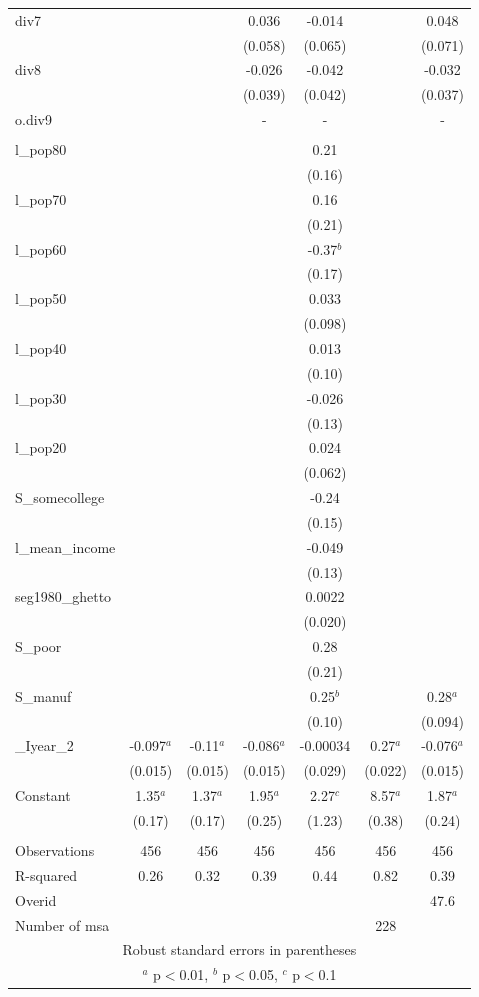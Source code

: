 \documentclass[]{article}
\begin{document}
\begin{tabular}{lcccccc}
div7 &  &  & 0.036 & -0.014 &  & 0.048 \\
 &  &  & (0.058) & (0.065) &  & (0.071) \\
div8 &  &  & -0.026 & -0.042 &  & -0.032 \\
 &  &  & (0.039) & (0.042) &  & (0.037) \\
o.div9 &  &  & - & - &  & - \\
 &  &  &  &  &  &  \\
l\_pop80 &  &  &  & 0.21 &  &  \\
 &  &  &  & (0.16) &  &  \\
l\_pop70 &  &  &  & 0.16 &  &  \\
 &  &  &  & (0.21) &  &  \\
l\_pop60 &  &  &  & -0.37$^b$ &  &  \\
 &  &  &  & (0.17) &  &  \\
l\_pop50 &  &  &  & 0.033 &  &  \\
 &  &  &  & (0.098) &  &  \\
l\_pop40 &  &  &  & 0.013 &  &  \\
 &  &  &  & (0.10) &  &  \\
l\_pop30 &  &  &  & -0.026 &  &  \\
 &  &  &  & (0.13) &  &  \\
l\_pop20 &  &  &  & 0.024 &  &  \\
 &  &  &  & (0.062) &  &  \\
S\_somecollege &  &  &  & -0.24 &  &  \\
 &  &  &  & (0.15) &  &  \\
l\_mean\_income &  &  &  & -0.049 &  &  \\
 &  &  &  & (0.13) &  &  \\
seg1980\_ghetto &  &  &  & 0.0022 &  &  \\
 &  &  &  & (0.020) &  &  \\
S\_poor &  &  &  & 0.28 &  &  \\
 &  &  &  & (0.21) &  &  \\
S\_manuf &  &  &  & 0.25$^b$ &  & 0.28$^a$ \\
 &  &  &  & (0.10) &  & (0.094) \\
\_Iyear\_2 & -0.097$^a$ & -0.11$^a$ & -0.086$^a$ & -0.00034 & 0.27$^a$ & -0.076$^a$ \\
 & (0.015) & (0.015) & (0.015) & (0.029) & (0.022) & (0.015) \\
Constant & 1.35$^a$ & 1.37$^a$ & 1.95$^a$ & 2.27$^c$ & 8.57$^a$ & 1.87$^a$ \\
 & (0.17) & (0.17) & (0.25) & (1.23) & (0.38) & (0.24) \\
 &  &  &  &  &  &  \\
Observations & 456 & 456 & 456 & 456 & 456 & 456 \\
R-squared & 0.26 & 0.32 & 0.39 & 0.44 & 0.82 & 0.39 \\
Overid &  &  &  &  &  & 47.6 \\
 Number of msa &  &  &  &  & 228 &  \\ \hline
\multicolumn{7}{c}{ Robust standard errors in parentheses} \\
\multicolumn{7}{c}{ $^a$ p$<$0.01, $^b$ p$<$0.05, $^c$ p$<$0.1} \\
\end{tabular}
\end{document}
